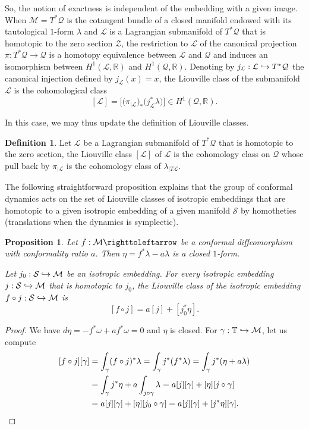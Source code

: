 \documentclass[10pt]{amsart}
\def\hto{\mathrel{\lhook\joinrel\to}}
\newtheorem{proposition}{Proposition}
\theoremstyle{definition}
\newtheorem{definition}[theorem]{Definition}
\def\R{\mathbb{R}}
\def\T{\mathbb{T}}
\def\cL{{\mathcal L}}
\def\cM{{\mathcal M}}
\def\cQ{{\mathcal Q}}
\def\cS{{\mathcal S}}
\def\cZ{{\mathcal Z}}
\begin{document}
So, the notion of exactness is independent of the embedding with a given image. When $\cM=T^*\cQ$ is the cotangent bundle of a closed manifold endowed with its tautological $1$-form $\lambda$ and $\cL$ is a Lagrangian submanifold of $T^*\cQ$ that is homotopic to the zero section $\cZ$, the restriction to $\cL$ of the canonical projection $\pi:T^*\cQ\to \cQ$ is a homotopy equivalence between $\cL$ and $\cQ$ and induces an isomorphism between $H^1(\cL,\R)$ and $H^1(\cQ,\R)$. Denoting by $j_\cL:\cL\hto T^*\cQ$ the canonical injection defined by $j_\cL(x)=x$, the Liouville class of the submanifold $\cL$ is the cohomological class
\[
[\cL]=\Big[\big(\pi_{|\cL}\big)_*\big(j_\cL^*\lambda\big)\Big]\in H^1(\cQ,\R).
\]

In this case, we may thus update the definition of Liouville classes.

\begin{definition}
Let $\cL$ be a Lagrangian submanifold of $T^*\cQ$ that is homotopic to the zero section, the Liouville class $[\cL]$ of $\cL$ is the cohomology class on $\cQ$ whose pull back by $\pi_{|\cL}$ is the cohomology class of $\lambda_{|T\cL}$.
\end{definition}

The following straightforward proposition explains that the group of conformal dynamics acts {on the set of} Liouville classes of isotropic embeddings { that are homotopic to a given isotropic embedding } of a given manifold $\cS$ by homotheties (translations when the dynamics is symplectic).

\begin{proposition}\label{Phomothety}
Let $f: \cM \righttoleftarrow$ be a conformal diffeomorphism with conformality ratio $a$. Then $\eta=f^*\lambda-a\lambda$ is a closed $1$-form.

Let $ j_0:\cS\hto\cM$ be an isotropic embedding. For every isotropic embedding $ j:\cS\hto\cM$ that is homotopic to $j_0$, the Liouville class of the isotropic embedding $f\circ j:\cS\hto\cM$ is
\[
[f\circ j]=a[j]+[j_0^*\eta].
\]
\end{proposition}

\begin{proof}
We have $d\eta=-f^*\omega+af^*\omega=0$ and $\eta$ is closed. 
For $\gamma:\T\hto\cM$, let us compute
\[
\begin{split}
[f\circ j][\gamma]&=\int_\gamma(f\circ j)^*\lambda=\int_\gamma j^*(f^*\lambda)=\int_\gamma j^*(\eta +a\lambda)\\
&=\int_\gamma j^*\eta+a\int_{j\circ\gamma} \lambda=a[j][\gamma]+ [\eta][j\circ\gamma]\\
&=a[j][\gamma]+ [\eta][j_0\circ\gamma]=a[j][\gamma]+ [j^*\eta][\gamma].\qedhere
\end{split}
\]
\end{proof}
\end{document}
